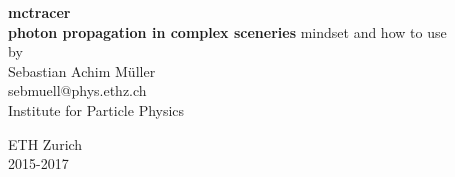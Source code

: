 \documentclass[11pt,a4paper,oneside,titlepage]{book}
\begin{document}
\makeatletter
{}
\def\lst@SkipToFirst{%
    \lst@ifmatchrangestart\c@lstnumber=\numexpr-1+\lst@firstline\fi
    \ifnum \lst@lineno<\lst@firstline
        \def\lst@next{\lst@BeginDropInput\lst@Pmode
        \lst@Let{13}\lst@MSkipToFirst
        \lst@Let{10}\lst@MSkipToFirst}%
        \expandafter\lst@next
    \else
        \expandafter\lst@BOLGobble
    \fi}
\makeatother
\newcommand{\tool}{mctracer}
\newcommand{\thetitle}{\tool\\ \large{photon propagation in complex sceneries}}
%
\thispagestyle{empty}
\begin{center}
\Huge\textbf{\thetitle}
%
\vfill
%
\Large
mindset and how to use\\
\vspace{20pt}
\normalsize
{by\\\Large Sebastian Achim M\"uller } \\[5pt]
%
{\normalsize sebmuell@phys.ethz.ch}\\
%
\vspace{20pt}
Institute for Particle Physics
\par\smallskip\noindent
ETH Zurich\\2015-2017
\end{center}
\tableofcontents
\cleardoublepage
%
\setcounter{page}{0}
%
\end{document}
